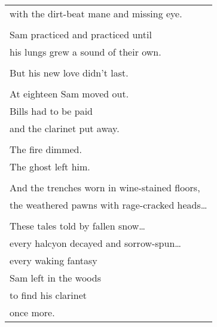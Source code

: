 \documentclass{article}
\begin{document}
\begin{center}
\begin{tabular}{l}
\hspace*{2ex}with the dirt-beat mane and missing eye. \\
\\
\hspace*{2ex}Sam practiced and practiced until \\
\hspace*{2ex}his lungs grew a sound of their own. \\
\\
\hspace*{2ex}But his new love didn't last. \\
\\
\hspace*{2ex}At eighteen Sam moved out. \\
\hspace*{2ex}Bills had to be paid \\
\hspace*{2ex}and the clarinet put away. \\
\\
The fire dimmed. \\
The ghost left him. \\
\\
And the trenches worn in wine-stained floors, \\
the weathered pawns with rage-cracked heads\ldots \\
\\
These tales told by fallen snow\ldots \\
every halcyon decayed and sorrow-spun\ldots \\
every waking fantasy \\
Sam left in the woods \\
to find his clarinet \\
once more. \\
\end{tabular}
\end{center}
\end{document}

